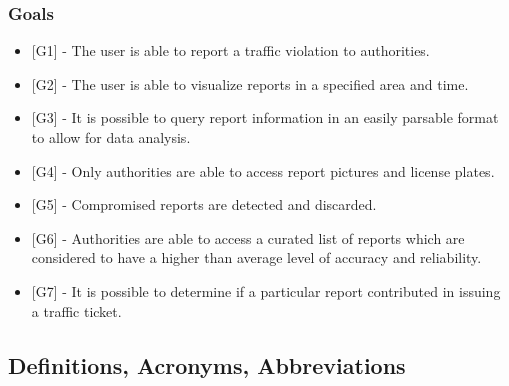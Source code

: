 \newcommand{\goalUserReport}{
    {[G1]} - The user is able to report a traffic violation to authorities.
}
\newcommand{\goalVisualizeReports}{
    {[G2]} - The user is able to visualize reports in a specified area and time.
}
\newcommand{\goalQueryInfo}{
    {[G3]} - It is possible to query report information in an easily parsable format to allow for data analysis.
}
\newcommand{\goalPhotosAuthoritiesOnly}{
    {[G4]} -  Only authorities are able to access report pictures and license plates.
}
\newcommand{\goalCompromisedReports}{
    {[G5]} - Compromised reports are detected and discarded.
}
\newcommand{\goalCuratedReports}{
    {[G6]} - Authorities are able to access a curated list of reports which are considered to have a higher than average level of accuracy and reliability.
}
\newcommand{\goalTicketAnalysis}{
    {[G7]} - It is possible to determine if a particular report contributed in issuing a traffic ticket.
}
\subsubsection{Goals}
\begin{itemize}[label={}]
\item \goalUserReport{}
\item \goalVisualizeReports{}
\item \goalQueryInfo{}
\item \goalPhotosAuthoritiesOnly{}
\item \goalCompromisedReports{}
\item \goalCuratedReports{}
\item \goalTicketAnalysis{}
\end{itemize}

\subsection{Definitions, Acronyms, Abbreviations}
